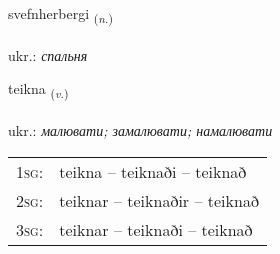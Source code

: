 \documentclass[frontgrid, backgrid]{flacards}\usepackage[]{graphicx}\usepackage[]{xcolor}
\begin{document}
\renewcommand{\flhead}{\vskip5pt \fboxsep=0pt {\small\bfseries\footnotesize Nafnorð | іменник}}
\renewcommand{\fcfoot}{\vskip5pt \fboxsep=0pt \hspace{2pt}{\small\bfseries\footnotesize 3K}}

\renewcommand{\blhead}{\vskip5pt {\small\bfseries\footnotesize Nafnorð | іменник }}
\renewcommand{\bcfoot}{\vskip5pt \hspace{2pt}{\small\bfseries\footnotesize 3K}}


{svefnherbergi \small{\textsubscript{(\textit{n.})}} \\[1ex] %
 \\
ukr.: \emph{спальня} \\  [2ex]
\renewcommand*{\arraystretch}{0.8}
}

\renewcommand{\flhead}{\vskip5pt \fboxsep=0pt {\small\bfseries\footnotesize Sagnorð | дієслово}}
\renewcommand{\fcfoot}{\vskip5pt \fboxsep=0pt \hspace{2pt}{\small\bfseries\footnotesize 3K}}

\renewcommand{\blhead}{\vskip5pt {\small\bfseries\footnotesize Sagnorð | дієслово }}
\renewcommand{\bcfoot}{\vskip5pt \hspace{2pt}{\small\bfseries\footnotesize 3K}}


{teikna \small{\textsubscript{(\textit{v.})}} \\[1ex] %
\textphonetic{[tʰeihkna]} \\
ukr.: \emph{малювати; замалювати; намалювати} \\  [2ex]
\renewcommand*{\arraystretch}{0.8}
\begin{tabular}{p{1cm}l}
\textsc{1sg}: & teikna -- teiknaði -- teiknað \\ 
\textsc{2sg}: & teiknar -- teiknaðir -- teiknað \\ 
\textsc{3sg}: & teiknar -- teiknaði -- teiknað \\ 
\end{tabular}
}
\end{document}
